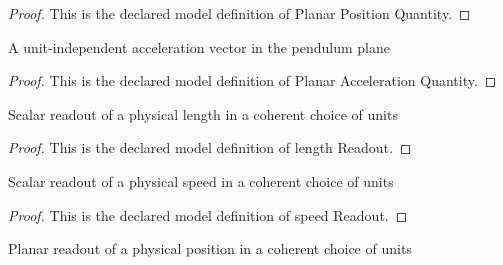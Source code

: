 \begin{proof}
  This is the declared model definition of Planar Position Quantity.
\end{proof}
\begin{definition}
  \label{def:physics:phyx-mini-0692:phyxminiproblems-problemphyxmini0692-planaraccelerationquantity}
  A unit-independent acceleration vector in the pendulum plane
\end{definition}
\begin{proof}
  This is the declared model definition of Planar Acceleration Quantity.
\end{proof}
\begin{definition}
  \label{def:physics:phyx-mini-0692:phyxminiproblems-problemphyxmini0692-lengthreadout}
  Scalar readout of a physical length in a coherent choice of units
\end{definition}
\begin{proof}
  This is the declared model definition of length Readout.
\end{proof}
\begin{definition}
  \label{def:physics:phyx-mini-0692:phyxminiproblems-problemphyxmini0692-speedreadout}
  Scalar readout of a physical speed in a coherent choice of units
\end{definition}
\begin{proof}
  This is the declared model definition of speed Readout.
\end{proof}
\begin{definition}
  \label{def:physics:phyx-mini-0692:phyxminiproblems-problemphyxmini0692-positionvectorreadout}
  Planar readout of a physical position in a coherent choice of units
\end{definition}
